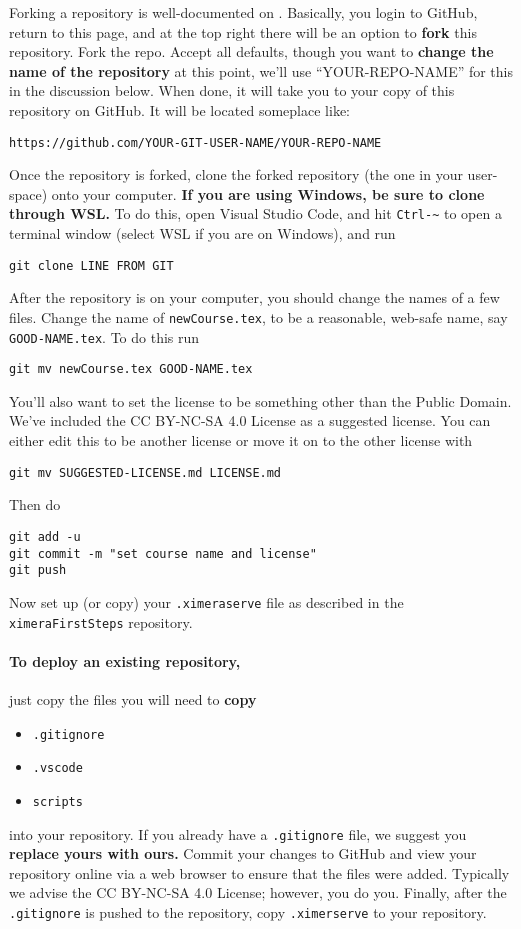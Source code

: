 \documentclass{ximera}
\begin{document}
Forking a repository is well-documented on
.
Basically, you login to GitHub, return to this page, and at the top right there
will be an option to \textbf{fork} this repository. Fork the repo. Accept all
defaults, though you want to \textbf{change the name of the repository} at this
point, we'll use ``YOUR-REPO-NAME'' for this in the discussion below. When done, it will take you to
your copy of this repository on GitHub. It will be located someplace like:
\begin{center}
  \texttt{https://github.com/YOUR-GIT-USER-NAME/YOUR-REPO-NAME}
\end{center}
Once the repository is forked, clone the forked repository (the one in your
user-space) onto your computer. \textbf{If you are using Windows, be sure to
  clone through WSL.} To do this, open Visual Studio Code, and hit \verb!Ctrl-~! to open a terminal window (select WSL if you are on Windows), and run
\begin{verbatim}
git clone LINE FROM GIT
\end{verbatim}
After the repository is on your computer, you should change the names of a few files. Change the name of \verb!newCourse.tex!, to be a reasonable, web-safe name, say \verb!GOOD-NAME.tex!. 
To do this run
\begin{verbatim}
git mv newCourse.tex GOOD-NAME.tex
\end{verbatim}
You'll also want to set the license to be something other than the Public Domain. We've included the CC BY-NC-SA 4.0
License as a suggested license. You can either edit this to be another license or move it on to the other license with
\begin{verbatim}
git mv SUGGESTED-LICENSE.md LICENSE.md
\end{verbatim}
Then do
\begin{verbatim}
git add -u 
git commit -m "set course name and license"
git push
\end{verbatim}
Now set up (or copy) your \verb!.ximeraserve! file as described in the \verb!ximeraFirstSteps! repository. 




\paragraph{To deploy an existing repository,} just copy the files
you will need to \textbf{copy}
\begin{itemize}
  \item \texttt{.gitignore}
  \item \texttt{.vscode}
  \item \texttt{scripts}
\end{itemize}
into your repository. If you already have a \verb|.gitignore| file, we suggest
you \textbf{replace yours with ours.} Commit your changes to GitHub and view your
repository online via a web browser to ensure that the files were added.
Typically we advise the CC BY-NC-SA 4.0 License; however, you do you.
Finally, after the \verb!.gitignore! is pushed to the repository, copy
\verb!.ximerserve! to your repository.
\end{document}
